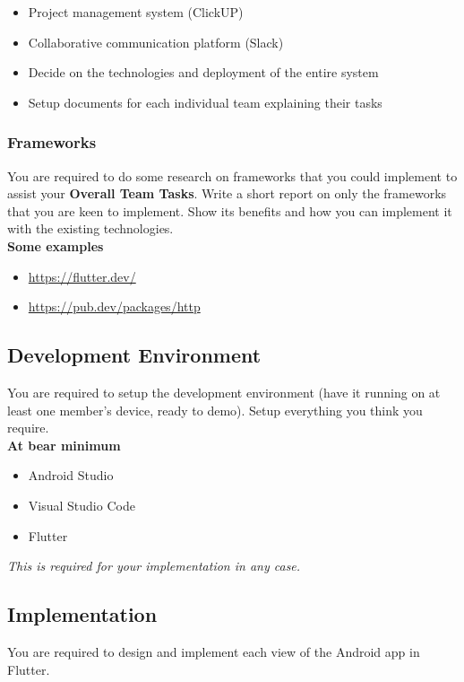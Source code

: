 \documentclass{article}
\begin{document}
\begin{itemize}
    \item Project management system (ClickUP)
    \item Collaborative communication platform (Slack)
    \item Decide on the technologies and deployment of the entire system
    \item Setup documents for each individual team explaining their tasks
\end{itemize}

\subsubsection{Frameworks}
You are required to do some research on frameworks that you could implement to assist your \textbf{Overall Team Tasks}. Write a short report on only the frameworks that you are keen to implement. Show its benefits and how you can implement it with the existing technologies. \\

\textbf{Some examples}
\begin{itemize}
    \item \url{https://flutter.dev/}
    \item \url{https://pub.dev/packages/http}
\end{itemize}

\subsection{Development Environment}
You are required to setup the development environment (have it running on at least one member's device, ready to demo). Setup everything you think you require. \\
\newline
\textbf{At bear minimum}
\begin{itemize}
    \item Android Studio
    \item Visual Studio Code
    \item Flutter
\end{itemize}

\begin{center}
   \textit{This is required for your implementation in any case.}
\end{center}

\newpage

\subsection{Implementation}
You are required to design and implement each view of the Android app in Flutter. \\
\end{document}
